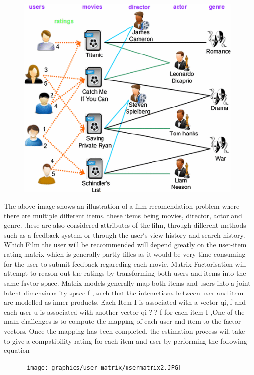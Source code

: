 \begin{figure}
  \includegraphics{graphics/user_matrix/usermatrix.JPG}
  \label{fig:usermatrix}
\end{figure}
The above image shows an illustration of a film recomendation problem where there are multiple different items. these items being movies, director, actor and genre. these are also considered attributes of the film, through different methods such as a feedback system or through the user`s view history and search history. Which Film the user will be reccommended will depend greatly on the user-item rating matrix which is generally partly filles as it would be very time consuming for the user to submit feedback regareding each movie. Matrix Factorisation will attempt to reason out the ratings by transforming both users and items into the same favtor space.
Matrix models generally map both items and users into a joint latent dimensionality space f , such that the interactions between user and item are modelled as inner products. Each Item I is associated with a vector qi, f and each user u is associated with another vector qi ? ? f for each item I ,One of the main challenges is to compute the mapping of each user and item to the factor vectors. Once the mapping has been completed, the estimation process will take to give a compatibility rating for each item and user by performing the following equation \citep{Avriel2003}

\begin{figure}
  \texttt{[image: graphics/user\_matrix/usermatrix2.JPG]}
  \label{fig:usermatrix2}
\end{figure}


